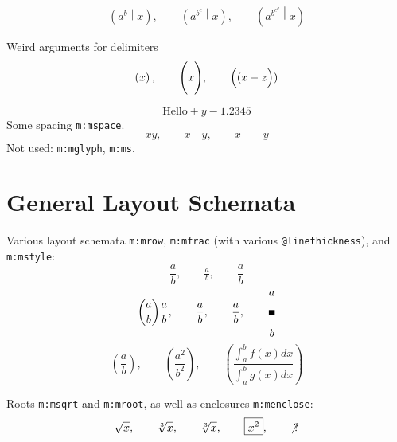 \documentclass{article}
\makeatletter
\newcommand{\mml}[1]{\texttt{m:#1}}
\newcommand{\attr}[1]{\texttt{@#1}}
\makeatother
\begin{document}
\begin{equation}
\left( a^{b}  \middle| x \right),\qquad
\left( a^{b^{c}} \middle| x \right),\qquad
\left( a^{b^{c^{d}}} \middle| x \right)
\end{equation}

Weird arguments for delimiters
\begin{equation}
 \left \relax ( x \right \relax ), \qquad
 \Bigg   ( x \Bigg{ \relax )  }, \qquad
 \Big{((} x-z \Big{))}
\end{equation}

\begin{equation}
 \mbox{Hello} + y - 1.2345
\end{equation}
Some spacing \mml{mspace}.
\begin{equation}
  xy,\qquad
  x \hspace{1em} y,\qquad
  x \hspace{2em} y
\end{equation}
Not used: \mml{mglyph}, \mml{ms}.

\section{General Layout Schemata}
Various layout schemata \mml{mrow}, \mml{mfrac} (with various \attr{linethickness}),
and \mml{mstyle}:
\begin{equation}
 \frac{a}{b},\qquad
 \tfrac{a}{b},\qquad
 \dfrac{a}{b}
\end{equation}
\begin{equation}
 \binom{a}{b}
 \genfrac{}{}{0.0ex}{}{a}{b},\qquad
 \genfrac{}{}{0.01ex}{}{a}{b},\qquad
 \genfrac{}{}{0.1ex}{}{a}{b},\qquad
 \genfrac{}{}{1ex}{}{a}{b}
\end{equation}
\begin{equation}
 \genfrac{(}{)}{}{}{a}{b},\qquad
 \genfrac{(}{)}{}{}{a^2}{b^2},\qquad
 \genfrac{(}{)}{}{}{\int_a^b f(x)dx}{\int_a^b g(x)dx}
\end{equation}

Roots \mml{msqrt} and \mml{mroot}, as well as enclosures \mml{menclose}:
\begin{equation}
 \sqrt{x},\qquad
 \sqrt[3]{x},\qquad
 \root 3 \of {x},\qquad
 \boxed{x^2},\qquad
 \not{?}
\end{equation}

\end{document}
